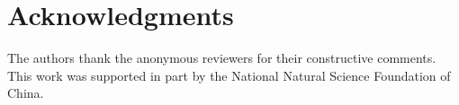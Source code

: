 \documentclass[lettersize,journal]{IEEEtran}
\begin{document}
\section*{Acknowledgments}

The authors thank the anonymous reviewers for their constructive comments.
This work was supported in part by the National Natural Science Foundation
of China.



\end{document}
